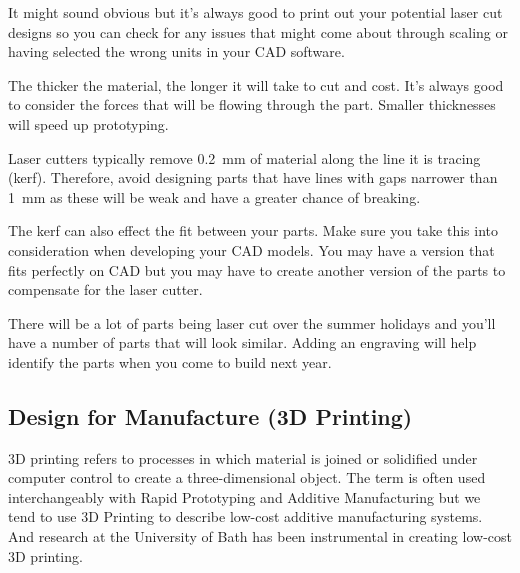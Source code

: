 It might sound obvious but it's always good to print out your potential laser cut designs so you can check for any issues that might come about through scaling or having selected the wrong units in your CAD software.

The thicker the material, the longer it will take to cut and cost. It's always good to consider the forces that will be flowing through the part. Smaller thicknesses will speed up prototyping.

Laser cutters typically remove \SI{0.2}{\milli\metre} of material along the line it is tracing (kerf). Therefore, avoid designing parts that have lines with gaps narrower than \SI{1}{\milli\metre} as these will be weak and have a greater chance of breaking.

The kerf can also effect the fit between your parts. Make sure you take this into consideration when developing your CAD models. You may have a version that fits perfectly on CAD but you may have to create another version of the parts to compensate for the laser cutter.

There will be a lot of parts being laser cut over the summer holidays and you'll have a number of parts that will look similar. Adding an engraving will help identify the parts when you come to build next year.

\subsection{Design for Manufacture (3D Printing)}

3D printing refers to processes in which material is joined or solidified under computer control to create a three-dimensional object. The term is often used interchangeably with Rapid Prototyping and Additive Manufacturing but we tend to use 3D Printing to describe low-cost additive manufacturing systems. And research at the University of Bath has been instrumental in creating low-cost 3D printing.

